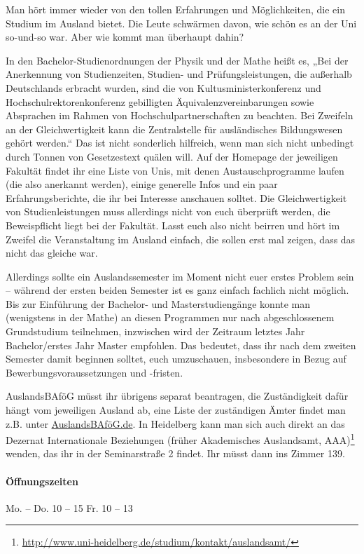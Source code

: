 \newpage{}%
Man hört immer wieder von den tollen Erfahrungen und Möglichkeiten, die ein Studium im Ausland bietet. Die Leute schwärmen davon, wie schön es an der Uni so-und-so war. Aber wie kommt man überhaupt dahin?

In den Bachelor-Studienordnungen der Physik und der Mathe heißt es, „Bei der Anerkennung von Studienzeiten, Studien- und Prüfungsleistungen, die außerhalb Deutschlands erbracht wurden, sind die von Kultusministerkonferenz und Hochschulrektorenkonferenz gebilligten Äquivalenzvereinbarungen sowie Absprachen im Rahmen von Hochschulpartnerschaften zu beachten. Bei Zweifeln an der Gleichwertigkeit kann die Zentralstelle für ausländisches Bildungswesen gehört werden.“ Das ist nicht sonderlich hilfreich, wenn man sich nicht unbedingt durch Tonnen von Gesetzestext quälen will. Auf der Homepage der jeweiligen Fakultät findet ihr eine Liste von Unis, mit denen Austauschprogramme laufen (die also anerkannt werden), einige generelle Infos und ein paar Erfahrungsberichte, die ihr bei Interesse anschauen solltet. Die Gleichwertigkeit von Studienleistungen muss allerdings nicht von euch überprüft werden, die Beweispflicht liegt bei der Fakultät. Lasst euch also nicht beirren und hört im Zweifel die Veranstaltung im Ausland einfach, die sollen erst mal zeigen, dass das nicht das gleiche war.

Allerdings sollte ein Auslandssemester im Moment nicht euer erstes Problem sein -- während der ersten beiden Semester ist es ganz einfach fachlich nicht möglich. Bis zur Einführung der Bachelor- und Masterstudiengänge konnte man (wenigstens in der Mathe) an diesen Programmen nur nach abgeschlossenem Grundstudium teilnehmen, inzwischen wird der Zeitraum letztes Jahr Bachelor/erstes Jahr Master empfohlen. Das bedeutet, dass ihr nach dem zweiten Semester damit beginnen solltet, euch umzuschauen, insbesondere in Bezug auf Bewerbungsvoraussetzungen und -fristen.

AuslandsBAföG müsst ihr übrigens separat beantragen, die Zuständigkeit dafür hängt vom jeweiligen Ausland ab, eine Liste der zuständigen Ämter findet man z.B. unter \url{AuslandsBAföG.de}. In Heidelberg kann man sich auch direkt an das Dezernat Internationale Beziehungen (früher Akademisches Auslandsamt, AAA)\footnote{\url{http://www.uni-heidelberg.de/studium/kontakt/auslandsamt/}} wenden, das ihr in der Seminarstraße 2 findet. Ihr müsst dann ins Zimmer 139.

\paragraph{Öffnungszeiten} Mo. -- Do. 10 -- 15 \qquad Fr. 10 -- 13

